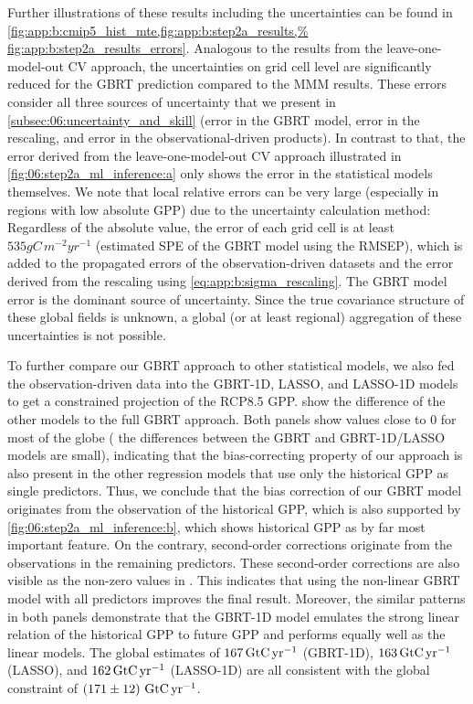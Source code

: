 Further illustrations of these results including the uncertainties can be found
in \cref{fig:app:b:cmip5_hist_mte,fig:app:b:step2a_results,%
  fig:app:b:step2a_results_errors}. Analogous to the results from the
leave-one-model-out \ac{CV} approach, the uncertainties on grid cell level
are significantly reduced for the \ac{GBRT} prediction compared to the
\ac{MMM} results. These errors consider all three sources of uncertainty that
we present in \cref{subsec:06:uncertainty_and_skill} (error in the \ac{GBRT}
model, error in the rescaling, and error in the observational-driven
products). In contrast to that, the error derived from the
leave-one-model-out \ac{CV} approach illustrated in
\cref{fig:06:step2a_ml_inference:a} only shows the error in the statistical
models themselves. We note that local relative errors can be very large
(especially in regions with low absolute \ac{GPP}) due to the uncertainty
calculation method: Regardless of the absolute value, the error of each grid
cell is at least $535 \unit{gC \, m^{-2} yr^{-1}}$ (estimated \ac{SPE} of the
\ac{GBRT} model using the \ac{RMSEP}), which is added to the propagated
errors of the observation-driven datasets and the error derived from the
rescaling using \cref{eq:app:b:sigma_rescaling}. The \ac{GBRT} model error is
the dominant source of uncertainty. Since the true covariance structure of
these global fields is unknown, a global (or at least regional) aggregation
of these uncertainties is not possible.

To further compare our \ac{GBRT} approach to other statistical models, we also
fed the observation-driven data into the \acs{GBRT}-1D, \ac{LASSO}, and
\acs{LASSO}-1D models to get a constrained projection of the \acs{RCP}8.5
\ac{GPP}. 
show the difference of the other models to the full \ac{GBRT} approach. Both
panels show values close to $0$ for most of the globe (\ie{} the differences
between the \ac{GBRT} and \acs{GBRT}-1D/\ac{LASSO} models are small),
indicating that the bias-correcting property of our approach is also present in
the other regression models that use only the historical \ac{GPP} as single
predictors. Thus, we conclude that the bias correction of our \ac{GBRT} model
originates from the observation of the historical \ac{GPP}, which is also
supported by \cref{fig:06:step2a_ml_inference:b}, which shows historical
\ac{GPP} as by far most important feature. On the contrary, second-order
corrections originate from the observations in the remaining predictors. These
second-order corrections are also visible as the non-zero values in
. This
indicates that using the non-linear \ac{GBRT} model with all predictors
improves the final result. Moreover, the similar patterns in both panels
demonstrate that the \acs{GBRT}-1D model emulates the strong linear relation of
the historical \ac{GPP} to future \ac{GPP} and performs equally well as the
linear models. The global estimates of $167 \unit{\GtCyr{}}$ (\acs{GBRT}-1D),
$163 \unit{\GtCyr{}}$ (\ac{LASSO}), and $162 \unit{\GtCyr{}}$ (\acs{LASSO}-1D)
are all consistent with the global constraint of
$\pmrangeunit{171}{12}{\GtCyr{}}$.


